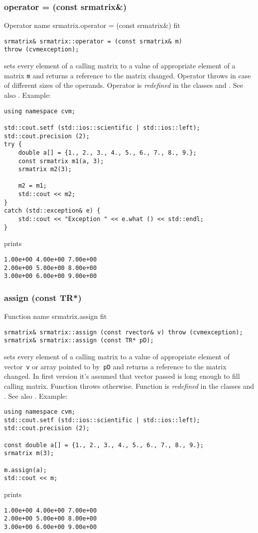 \subsubsection{operator = (const srmatrix\&)}
Operator%
\pdfdest name {srmatrix.operator = (const srmatrix&)} fit
\begin{verbatim}
srmatrix& srmatrix::operator = (const srmatrix& m)
throw (cvmexception);
\end{verbatim}
sets  every element of a calling matrix to a value of
appropriate element of a matrix \verb"m"
and returns a reference to
the matrix changed.
Operator throws  
in case of different sizes of the operands.
Operator is \emph{redefined} in the classes
and .
See also .
Example:
\begin{Verbatim}
using namespace cvm;

std::cout.setf (std::ios::scientific | std::ios::left); 
std::cout.precision (2);
try {
    double a[] = {1., 2., 3., 4., 5., 6., 7., 8., 9.};
    const srmatrix m1(a, 3);
    srmatrix m2(3);

    m2 = m1;
    std::cout << m2;
}
catch (std::exception& e) {
    std::cout << "Exception " << e.what () << std::endl;
}
\end{Verbatim}
prints
\begin{Verbatim}
1.00e+00 4.00e+00 7.00e+00
2.00e+00 5.00e+00 8.00e+00
3.00e+00 6.00e+00 9.00e+00
\end{Verbatim}
\newpage



\subsubsection{assign (const TR*)}
Function%
\pdfdest name {srmatrix.assign} fit
\begin{verbatim}
srmatrix& srmatrix::assign (const rvector& v) throw (cvmexception);
srmatrix& srmatrix::assign (const TR* pD);
\end{verbatim}
sets every element of a calling matrix to a value of
appropriate element of  vector~\verb'v'
or  array pointed to by~\verb"pD"
and returns a reference to
the matrix changed.
In first version it's assumed that vector passed is long
enough to fill calling matrix. Function throws  
otherwise.
Function is \emph{redefined} in the classes
and .
See also .
Example:
\begin{Verbatim}
using namespace cvm;
std::cout.setf (std::ios::scientific | std::ios::left); 
std::cout.precision (2);

const double a[] = {1., 2., 3., 4., 5., 6., 7., 8., 9.};
srmatrix m(3);

m.assign(a);
std::cout << m;
\end{Verbatim}
prints
\begin{Verbatim}
1.00e+00 4.00e+00 7.00e+00
2.00e+00 5.00e+00 8.00e+00
3.00e+00 6.00e+00 9.00e+00
\end{Verbatim}
\newpage




